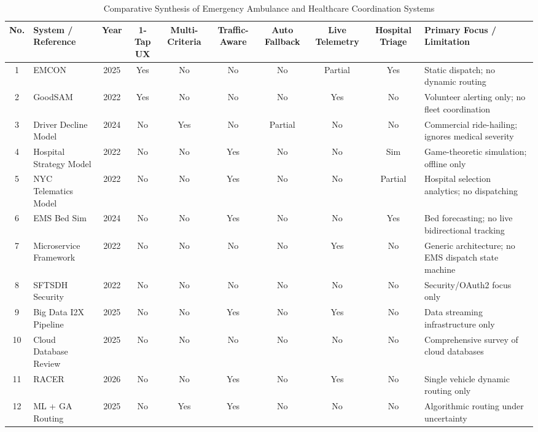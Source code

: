 \documentclass[conference]{IEEEtran}
\begin{document}
\begin{table}[htbp]
\caption{Comparative Synthesis of Emergency Ambulance and Healthcare Coordination Systems}
\label{tab:comparison}
\centering
\scriptsize
\begin{tabularx}{\textwidth}{clcccccccl}
\toprule
\textbf{No.} & \textbf{System / Reference} & \textbf{Year} & \textbf{1-Tap UX} & \textbf{Multi-Criteria} & \textbf{Traffic-Aware} & \textbf{Auto Fallback} & \textbf{Live Telemetry} & \textbf{Hospital Triage} & \textbf{Primary Focus / Limitation} \\
\midrule
1 & EMCON \cite{emcon} & 2025 & Yes & No & No & No & Partial & Yes & Static dispatch; no dynamic routing \\
2 & GoodSAM \cite{goodsam} & 2022 & Yes & No & No & No & Yes & No & Volunteer alerting only; no fleet coordination \\
3 & Driver Decline Model \cite{zhou2024freelance} & 2024 & No & Yes & No & Partial & No & No & Commercial ride-hailing; ignores medical severity \\
4 & Hospital Strategy Model \cite{fu2022modelling} & 2022 & No & No & Yes & No & No & Sim & Game-theoretic simulation; offline only \\
5 & NYC Telematics Model \cite{olivier2022data} & 2022 & No & No & Yes & No & No & Partial & Hospital selection analytics; no dispatching \\
6 & EMS Bed Sim \cite{xu2024emergency} & 2024 & No & No & Yes & No & No & Yes & Bed forecasting; no live bidirectional tracking \\
7 & Microservice Framework \cite{zaki2022introducing} & 2022 & No & No & No & No & Yes & No & Generic architecture; no EMS dispatch state machine \\
8 & SFTSDH Security \cite{chatterjee2022sftsdh} & 2022 & No & No & No & No & No & No & Security/OAuth2 focus only \\
9 & Big Data I2X Pipeline \cite{garcia2025big} & 2025 & No & No & Yes & No & Yes & No & Data streaming infrastructure only \\
10 & Cloud Database Review \cite{dritsas2025database} & 2025 & No & No & No & No & No & No & Comprehensive survey of cloud databases \\
11 & RACER \cite{ankarboina2026racer} & 2026 & No & No & Yes & No & Yes & No & Single vehicle dynamic routing only \\
12 & ML + GA Routing \cite{nozari2025designing} & 2025 & No & Yes & Yes & No & No & No & Algorithmic routing under uncertainty \\

\end{tabularx}
\end{table}
\end{document}
